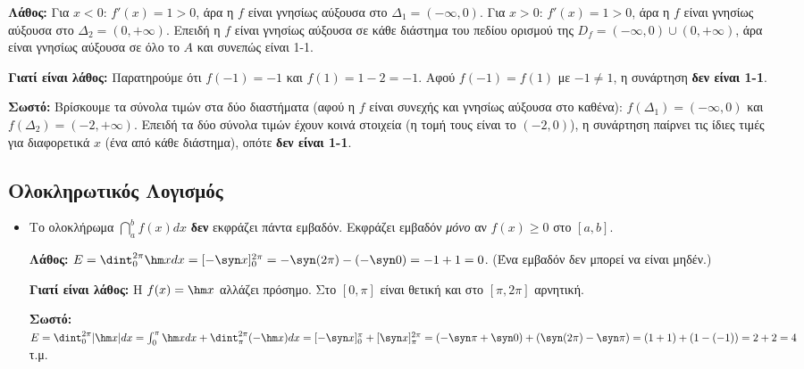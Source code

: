 \begin{itemize}[label=\textcolor{red!80!black}{\faExclamationTriangle},itemindent=7mm,leftmargin=0mm]
\lysh
\textbf{Λάθος:} 
Για $x < 0$: $f'(x) = 1 > 0$, άρα η $f$ είναι γνησίως αύξουσα στο $\Delta_1 = (-\infty, 0)$.
Για $x > 0$: $f'(x) = 1 > 0$, άρα η $f$ είναι γνησίως αύξουσα στο $\Delta_2 = (0, +\infty)$.
Επειδή η $f$ είναι γνησίως αύξουσα σε κάθε διάστημα του πεδίου ορισμού της $D_f = (-\infty, 0) \cup (0, +\infty)$, άρα είναι γνησίως αύξουσα σε όλο το $A$ και συνεπώς είναι 1-1.

\textbf{Γιατί είναι λάθος:} Παρατηρούμε ότι $f(-1) = -1$ και $f(1) = 1-2 = -1$.
Αφού $f(-1) = f(1)$ με $-1 \neq 1$, η συνάρτηση \textbf{δεν είναι 1-1}.

\textbf{Σωστό:}
Βρίσκουμε τα σύνολα τιμών στα δύο διαστήματα (αφού η $f$ είναι συνεχής και γνησίως αύξουσα στο καθένα):
$f(\Delta_1) = (-\infty, 0)$ και $f(\Delta_2) = (-2, +\infty)$.
Επειδή τα δύο σύνολα τιμών έχουν κοινά στοιχεία (η τομή τους είναι το $(-2, 0)$), η συνάρτηση παίρνει τις ίδιες τιμές για διαφορετικά $x$ (ένα από κάθε διάστημα), οπότε \textbf{δεν είναι 1-1}.
\end{itemize}

\subsection{Ολοκληρωτικός Λογισμός}

\begin{itemize}[label=\textcolor{red!80!black}{\faExclamationTriangle},itemindent=7mm,leftmargin=0mm]
\item {}

Το ολοκλήρωμα $\dint_a^b f(x)dx$ \textbf{δεν} εκφράζει πάντα εμβαδόν. Εκφράζει εμβαδόν \textit{μόνο} αν $f(x) \ge 0$ στο $[a, b]$.


\lysh
\textbf{Λάθος:} 
$E = \dint_0^{2\pi} \hm x dx = [-\syn x]_0^{2\pi} = -\syn(2\pi) - (-\syn 0) = -1 + 1 = 0$. (Ένα εμβαδόν δεν μπορεί να είναι μηδέν.)

\textbf{Γιατί είναι λάθος:} Η $f(x) = \hm x$ αλλάζει πρόσημο. Στο $[0, \pi]$ είναι θετική και στο $[\pi, 2\pi]$ αρνητική.

\textbf{Σωστό:}
$E = \dint_0^{2\pi} |\hm x| dx = \int_0^{\pi} \hm x dx + \dint_{\pi}^{2\pi} (-\hm x) dx= [-\syn x]_0^{\pi} + [\syn x]_{\pi}^{2\pi} = (-\syn \pi + \syn 0) + (\syn(2\pi) - \syn \pi) = (1 + 1) + (1 - (-1)) = 2 + 2 = 4$ τ.μ.
\end{itemize}

